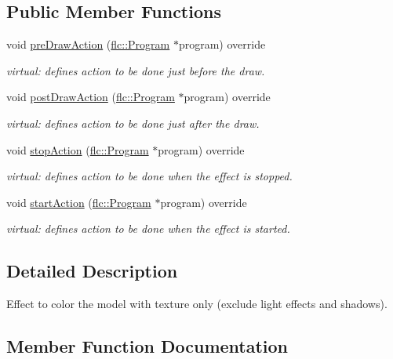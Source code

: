 \subsection*{Public Member Functions}
\begin{DoxyCompactItemize}
\item 
void \hyperlink{classflw_1_1flf_1_1TextureOnly_a58511d525bcd55ff7cf636a08be9afc1}{pre\+Draw\+Action} (\hyperlink{classflw_1_1flc_1_1Program}{flc\+::\+Program} $\ast$program) override
\begin{DoxyCompactList}\small\item\em virtual\+: defines action to be done just before the draw. \end{DoxyCompactList}\item 
void \hyperlink{classflw_1_1flf_1_1TextureOnly_a23865e0a5b720fa183cfaf102e6471ea}{post\+Draw\+Action} (\hyperlink{classflw_1_1flc_1_1Program}{flc\+::\+Program} $\ast$program) override
\begin{DoxyCompactList}\small\item\em virtual\+: defines action to be done just after the draw. \end{DoxyCompactList}\item 
void \hyperlink{classflw_1_1flf_1_1TextureOnly_ae23d8e028389fd4894135247574f976b}{stop\+Action} (\hyperlink{classflw_1_1flc_1_1Program}{flc\+::\+Program} $\ast$program) override
\begin{DoxyCompactList}\small\item\em virtual\+: defines action to be done when the effect is stopped. \end{DoxyCompactList}\item 
void \hyperlink{classflw_1_1flf_1_1TextureOnly_a5a04ae9211a3fb98df63166d3e009a5a}{start\+Action} (\hyperlink{classflw_1_1flc_1_1Program}{flc\+::\+Program} $\ast$program) override
\begin{DoxyCompactList}\small\item\em virtual\+: defines action to be done when the effect is started. \end{DoxyCompactList}\end{DoxyCompactItemize}


\subsection{Detailed Description}
Effect to color the model with texture only (exclude light effects and shadows). 

\subsection{Member Function Documentation}
\mbox{\label{classflw_1_1flf_1_1TextureOnly_a23865e0a5b720fa183cfaf102e6471ea}} 
